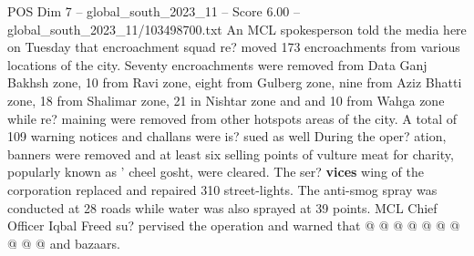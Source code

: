 \begin{textsample}{POS Dim 7 – global\_south\_2023\_11 – Score 6.00 – global\_south\_2023\_11/103498700.txt}
An MCL spokesperson told the media here on Tuesday that encroachment squad re? moved 173 encroachments from various locations of the city.
Seventy encroachments were removed from Data Ganj Bakhsh zone, 10 from Ravi zone, eight from Gulberg zone, nine from Aziz Bhatti zone, 18 from Shalimar zone, 21 in Nishtar zone and and 10 from Wahga zone while re? maining were removed from other hotspots areas of the city.
A total of 109 warning notices and challans were is? sued as well During the oper? ation, banners were removed and at least six selling points of vulture meat for charity, popularly known as ' cheel gosht, were cleared.
The ser? \textbf{vices} wing of the corporation replaced and repaired 310 street-lights.
The anti-smog spray was conducted at 28 roads while water was also sprayed at 39 points.
MCL Chief Officer Iqbal Freed su? pervised the operation and warned that @ @ @ @ @ @ @ @ @ @ and bazaars.

\end{textsample}
